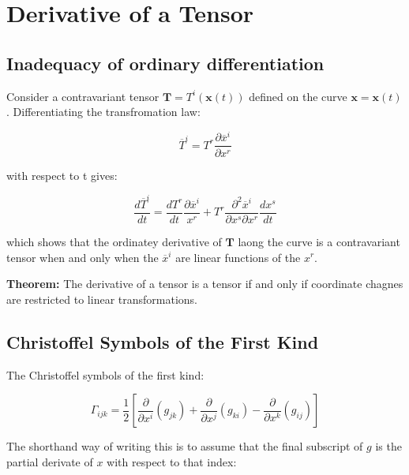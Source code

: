 \documentclass{article}
\begin{document}
%
%
\newpage
\section{Derivative of a Tensor}


\subsection{Inadequacy of ordinary differentiation}

Consider a contravariant tensor $\mathbf{ T } = T^i(\mathbf{ x }(t))$ defined on the curve $\mathbf{ x } = \mathbf{ x }(t)$.  Differentiating the transfromation law:


\begin{equation*}
	\overline{ T }^i = T^r \frac{ \partial \overline{ x }^i }{ \partial x^r }
\end{equation*}

\noindent with respect to t gives:

\begin{equation*}
	\frac{ d \overline{ T }^i }{ dt } = \frac{ dT^r }{ dt } \frac{ \partial \overline{ x }^i }{ x^r } + T^r \frac{ \partial^2 \overline{ x }^i }{ \partial x^s \partial x^r } \frac{ dx^s }{ dt }
\end{equation*}

\noindent which shows that the ordinatey derivative of $\mathbf{ T }$ laong the curve is a contravariant tensor when and only when the $\overline{ x }^i$ are linear functions of the $x^r$.

\noindent \textbf{Theorem: }
The derivative of a tensor is a tensor if and only if coordinate chagnes are restricted to linear transformations.





\subsection{Christoffel Symbols of the First Kind}

The Christoffel symbols of the first kind:

\begin{equation}
	\Gamma_{ijk} = \frac{ 1 }{ 2 } \left[ \frac{ \partial }{ \partial x^i }(g_{jk}) + \frac{ \partial }{ \partial x^j }(g_{ki}) - \frac{ \partial }{ \partial x^k }(g_{ij})\right]
\end{equation}

The shorthand way of writing this is to assume that the final subscript of $g$ is the partial derivate of $x$ with respect to that index:
\end{document}
